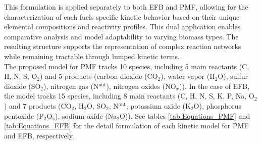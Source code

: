 \documentclass[preprint,12pt]{elsarticle}
\begin{document}
This formulation is applied separately to both EFB and PMF, allowing for the characterization of each fuels specific kinetic behavior based on their unique elemental compositions and reactivity profiles. This dual application enables comparative analysis and model adaptability to varying biomass types. The resulting structure supports the representation of complex reaction networks while remaining tractable through lumped kinetic terms.\\

The proposed model for PMF tracks 10 species, including 5 main reactants  (C, H, N, S, O$_2$) and 5 products (carbon dioxide (CO$_2$), water vapor (H$_2$O), sulfur dioxide (SO$_2$), nitrogen gas (N$^{\text{out}}$), nitrogen oxides (NO$_x$)). In the case of EFB, the model tracks 15 species, including 8 main reactants (C, H, N, S, K, P, Na, O$_2$) and 7 products (CO$_2$, H$_2$O, SO$_2$, N$^{\text{out}}$, potassium oxide (K$_2$O), phosphorus pentoxide (P$_2$O$_5$), sodium oxide (Na$_2$O)). See tables \ref{tab:Equations_PMF} and \ref{tab:Equations_EFB} for the detail formulation of each kinetic model for PMF and EFB, respectively. \\
\end{document}
